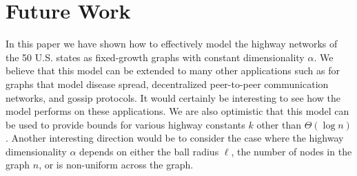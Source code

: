 \section{Future Work}

In this paper we have shown how to effectively model the highway networks of the
50 U.S. states as fixed-growth graphs with constant dimensionality $\alpha$.
We believe that this model can be extended to many other applications such as
for graphs that model disease spread, decentralized peer-to-peer communication
networks, and gossip protocols.
It would certainly be interesting to see how the model performs on these
applications.
We are also optimistic that this model can be used to provide bounds for various
highway constants $k$ other than $\Theta(\log{n})$.
Another interesting direction would be to consider the case where the highway
dimensionality $\alpha$ depends on either the ball radius $\ell$, the number
of nodes in the graph $n$, or is non-uniform across the graph.
